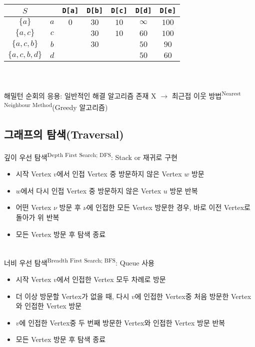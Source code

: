 \begin{center}
    \begin{tabular}[1.5]{c|c|c|c|c|c|c}
        $S$              &     & \texttt{D[a]} & \texttt{D[b]} & \texttt{D[c]} & \texttt{D[d]} & \texttt{D[e]} \\
        \hline
        $\{a\}$          & $a$ & $0$           & $30$          & $10$          & $\infty$      & $100$         \\
        $\{a, c\}$       & $c$ &               & $30$          & $10$          & $60$          & $100$         \\
        $\{a, c, b\}$    & $b$ &               & $30$          &               & $50$          & $90$          \\
        $\{a, c, b, d\}$ & $d$ &               &               &               & $50$          & $60$          \\
    \end{tabular}
\end{center}\phantom{}\\\\
해밀턴 순회의 응용: 일반적인 해결 알고리즘 존재 X $\to$ 최근접 이웃 방법\textsuperscript{Nearest Neighbour Method}(Greedy 알고리즘)
\newpage
\subsection{그래프의 탐색(Traversal)}
깊이 우선 탐색\textsuperscript{Depth First Search; DFS}: Stack or 재귀로 구현
\begin{itemize}
    \item 시작 Vertex $v$에서 인접 Vertex 중 방문하지 않은 Vertex $w$ 방문
    \item $w$에서 다시 인접 Vertex 중 방문하지 않은 Vertex $u$ 방문 반복
    \item 어떤 Vertex $\nu$ 방문 후 $\nu$에 인접한 모든 Vertex 방문한 경우, 바로 이전 Vertex로 돌아가 위 반복
    \item 모든 Vertex 방문 후 탐색 종료
\end{itemize}
\phantom{}\\
너비 우선 탐색\textsuperscript{Breadth First Search; BFS}: Queue 사용
\begin{itemize}
    \item 시작 Vertex $v$에서 인접한 Vertex 모두 차례로 방문
    \item 더 이상 방문할 Vertex가 없을 때, 다시 $v$에 인접한 Vertex중 처음 방문한 Vertex와 인접한 Vertex 방문
    \item $v$에 인접한 Vertex중 두 번째 방문한 Vertex와 인접한 Vertex 방문 반복
    \item 모든 Vertex 방문 후 탐색 종료
\end{itemize}

